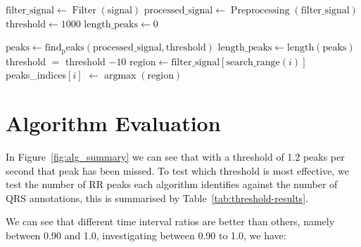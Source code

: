 \begin{center}
\begin{algorithm}
\caption{Basic Algorithm form}
\begin{algorithmic}

    \State $\text{filter\_signal} \gets \operatorname{Filter}(\text{signal})$
    \State $\text{processed\_signal} \gets \operatorname{Preprocessing}(\text{filter\_signal})$
    \State $\text{threshold} \gets 1000$
    \State $\text{length\_peaks} \gets 0$

        \State $\text{peaks} \gets \operatorname{find_peaks}(\text{processed\_signal}, \text{threshold})$
        \State $\text{length\_peaks} \gets \text{length}(\text{peaks})$
        \State threshold $=$ threshold $- 10$
    \EndWhile
    \State $\text{region} \gets \text{filter\_signal}[\text{search\_range}(i)]$
    \State peaks\_indices$[i]$ $\gets \operatorname{argmax}(\text{region})$
    \EndFor

\end{algorithmic}
\end{algorithm}
\end{center}


\section{Algorithm Evaluation}
In Figure~\ref{fig:alg_summary} we can see that with a threshold of 1.2 peaks per second that peak has been missed. To test 
which threshold is most effective, we test the number of RR peaks each algorithm identifies against the number of QRS annotations, this 
is summarised by Table~\ref{tab:threshold-results}.

\begin{table}[H]
    \centering
    \caption{Proportion of peaks detected for different threshold values between 0.8 and 1.4 in the first hour of data.}
    \label{tab:threshold-results}


\end{table}

We can see that different time interval ratios are better than others, namely between 0.90 and 1.0, investigating between 0.90 to 1.0, we have:
\begin{table}[H]
    \centering
    \caption{Proportion of peaks detected for different threshold values between 0.9 and 1.0 in the first hour of data.}
    \label{tab:threshold-results_0.90}


\end{table}

